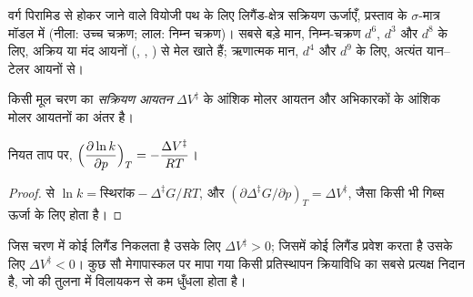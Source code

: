 \begin{omfigure}

{\small वर्ग पिरामिड से होकर जाने वाले वियोजी पथ के लिए लिगैंड-क्षेत्र सक्रियण ऊर्जाएँ,
प्रस्ताव के $\sigma$-मात्र मॉडल में (नीला: उच्च चक्रण;
लाल: निम्न चक्रण)। सबसे बड़े मान,
निम्न-चक्रण $d^6$, $d^3$ और $d^8$ के लिए, अक्रिय या मंद आयनों (, , ) से मेल खाते हैं;
ऋणात्मक मान, $d^4$ और $d^9$ के लिए, अत्यंत  यान--टेलर आयनों से।}
\end{omfigure}

\begin{definition}[सक्रियण आयतन]\label{def:b3:complex-mechanisms:activation-volume}
किसी मूल चरण का \emph{सक्रियण आयतन} $\Delta V^{\ddagger}$  के आंशिक मोलर आयतन और अभिकारकों के आंशिक मोलर आयतनों का अंतर है।
\end{definition}

\begin{proposition}[दर स्थिरांक की दाब-निर्भरता]\label{prop:b3:complex-mechanisms:pressure}
नियत ताप पर, $\displaystyle\Bigl(\frac{\partial\ln k}{\partial p}\Bigr)_T = -\frac{\Delta V^{\ddagger}}{RT}$।
\end{proposition}

\begin{proof}
 से $\ln k = \text{स्थिरांक} - \Delta^{\ddagger}G/RT$, और $(\partial\Delta^{\ddagger}G/\partial p)_T = \Delta V^{\ddagger}$, जैसा
किसी भी गिब्स ऊर्जा के लिए होता है।
\end{proof}

जिस चरण में कोई लिगैंड निकलता है उसके लिए $\Delta V^{\ddagger} > 0$; जिसमें कोई लिगैंड प्रवेश करता है उसके लिए $\Delta V^{\ddagger}
< 0$। कुछ सौ मेगापास्कल पर मापा गया  किसी प्रतिस्थापन क्रियाविधि का
सबसे प्रत्यक्ष निदान है, जो  की तुलना में विलायकन से कम
धुँधला होता है।

